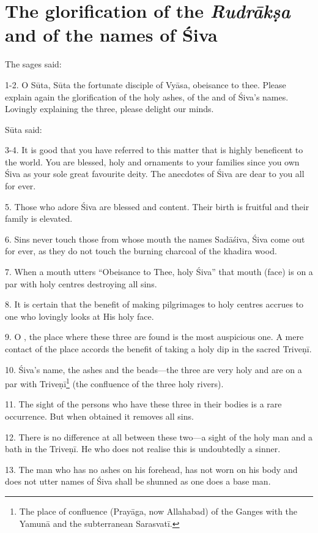 \chapter{The glorification of the \emph{Rudrākṣa} and of the names of Śiva}

The sages said:

1-2. O Sūta, Sūta the fortunate disciple of Vyāsa, obeisance to thee. Please
explain again the glorification of the holy ashes, of the  and of
Śiva’s names. Lovingly explaining the three, please delight our minds.

Sūta said:

3-4. It is good that you have referred to this matter that is highly beneficent
to the world. You are blessed, holy and ornaments to your families since you
own Śiva as your sole great favourite deity. The anecdotes of Śiva are dear to
you all for ever.

5. Those who adore Śiva are blessed and content. Their birth is fruitful and
their family is elevated.

6. Sins never touch those from whose mouth the names Sadāśiva, Śiva \etc come
out for ever, as they do not touch the burning charcoal of the khadira wood.

7. When a mouth utters “Obeisance to Thee, holy Śiva” that mouth (face) is on
a par with holy centres destroying all sins.

8. It is certain that the benefit of making pilgrimages to holy centres accrues
to one who lovingly looks at His holy face.

9. O , the place where these three are found is the most
auspicious one. A mere contact of the place accords the benefit of taking a holy
dip in the sacred Triveṇī.

10. Śiva’s name, the ashes and the  beads—the three are very holy
and are on a par with Triveṇī\footnote{The place of confluence (Prayāga, now
Allahabad) of the Ganges with the Yamunā and the subterranean Sarasvatī.}
(the confluence of the three holy rivers).

11. The sight of the persons who have these three in their bodies is a rare
occurrence. But when obtained it removes all sins.

12. There is no difference at all between these two—a sight of the holy man and
a bath in the Triveṇī. He who does not realise this is undoubtedly a sinner.

13. The man who has no ashes on his forehead, has not worn  on his
body and does not utter names of Śiva shall be shunned as one does a base man.

